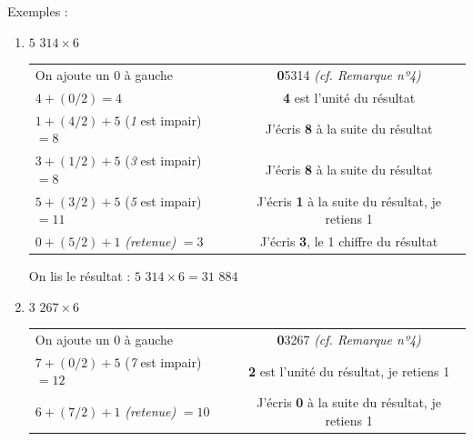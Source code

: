 \documentclass[a4paper]{article}
\begin{document}
{ \parindent=0.5cm Exemples : }

\begin{small}
\begin{enumerate}

	\item $5$ $314 \times 6$
	
	\begin{tabular}{l|c}

		On ajoute un 0 à gauche & \textbf{0}5314 \textit{(cf. Remarque nº4)}
		
		\tabularnewline		
		
		$4 + (0/2) = 4$ & \textbf{4} est l'unité du résultat
		
		\tabularnewline
		
		$1 + (4/2) + 5$ (\textit{1} est impair) $= 8$ & J'écris \textbf{8} à la suite du résultat
		
		\tabularnewline
		
		
		$3 + (1/2) + 5$ (\textit{3} est impair) $= 8$ & J'écris \textbf{8} à la suite du résultat
		
		\tabularnewline
		
		
		$5 + (3/2) + 5$ (\textit{5} est impair) $= 11$ & J'écris \textbf{1} à la suite du résultat, je retiens 1
		
		\tabularnewline
		
		$0 + (5/2) + 1$ \textit{(retenue)} $= 3$ & J'écris \textbf{3}, le 1\up{er} chiffre du résultat
		
	\end{tabular}
	
	On lis le résultat : {\boldmath $5$ $314 \times 6 = 31$ $884$}\\





	\item $3$ $267 \times 6$
	
	\begin{tabular}{l|c}

		On ajoute un 0 à gauche & \textbf{0}3267 \textit{(cf. Remarque nº4)}
		
		\tabularnewline
		
		$7 + (0/2) + 5$ (\textit{7} est impair) $= 12$ & \textbf{2} est l'unité du résultat, je retiens 1
				
		\tabularnewline
		
		$6 + (7/2) + 1$ \textit{(retenue)} $= 10$ & J'écris \textbf{0} à la suite du résultat, je retiens 1
		
		\tabularnewline
		

\end{tabular}
\end{enumerate}
\end{small}
\end{document}

